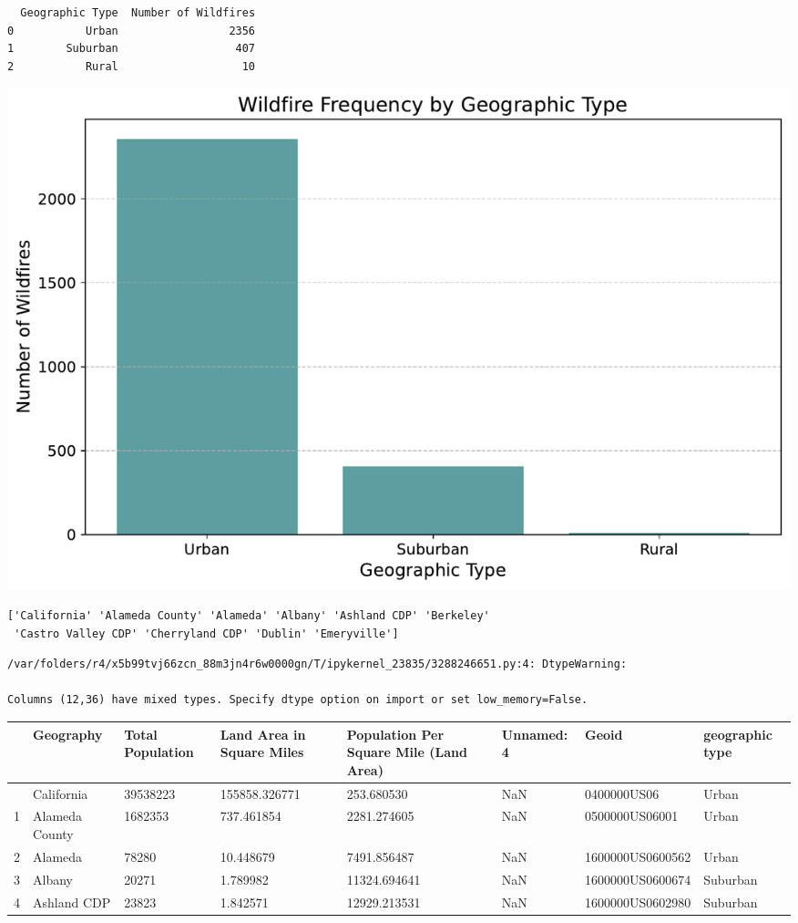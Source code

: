 \documentclass[
  letterpaper,
  DIV=11,
  numbers=noendperiod]{scrartcl}
\begin{document}
\begin{verbatim}
  Geographic Type  Number of Wildfires
0           Urban                 2356
1        Suburban                  407
2           Rural                   10
\end{verbatim}

\includegraphics{Final Writeup_files/figure-pdf/cell-7-output-2.pdf}

\begin{verbatim}
['California' 'Alameda County' 'Alameda' 'Albany' 'Ashland CDP' 'Berkeley'
 'Castro Valley CDP' 'Cherryland CDP' 'Dublin' 'Emeryville']
\end{verbatim}

\begin{verbatim}
/var/folders/r4/x5b99tvj66zcn_88m3jn4r6w0000gn/T/ipykernel_23835/3288246651.py:4: DtypeWarning:

Columns (12,36) have mixed types. Specify dtype option on import or set low_memory=False.
\end{verbatim}

\begin{longtable}[]{@{}llllllll@{}}
\toprule\noalign{}
& Geography & Total Population & Land Area in Square Miles & Population
Per Square Mile (Land Area) & Unnamed: 4 & Geoid & geographic type \\
\midrule\noalign{}
\endhead
\bottomrule\noalign{}
\endlastfoot
0 & California & 39538223 & 155858.326771 & 253.680530 & NaN &
0400000US06 & Urban \\
1 & Alameda County & 1682353 & 737.461854 & 2281.274605 & NaN &
0500000US06001 & Urban \\
2 & Alameda & 78280 & 10.448679 & 7491.856487 & NaN & 1600000US0600562 &
Urban \\
3 & Albany & 20271 & 1.789982 & 11324.694641 & NaN & 1600000US0600674 &
Suburban \\
4 & Ashland CDP & 23823 & 1.842571 & 12929.213531 & NaN &
1600000US0602980 & Suburban \\
\end{longtable}
\end{document}
